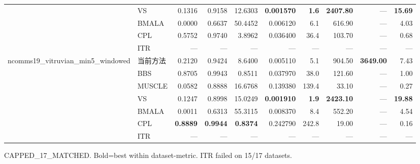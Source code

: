 \begin{table}[htbp]
\begin{tabular}{llrrrrrrrr}
 & VS & 0.1316 & 0.9158 & 12.6303 & \textbf{0.001570} & \textbf{1.6} & \textbf{2407.80} & — & \textbf{15.69} \\
 & BMALA & 0.0000 & 0.6637 & 50.4452 & 0.006120 & 6.1 & 616.90 & — & 4.03 \\
 & CPL & 0.5752 & 0.9740 & 3.8962 & 0.036400 & 36.4 & 103.70 & — & 0.68 \\
 & ITR & — & — & — & — & — & — & — & — \\
\midrule
\multirow{7}{*}{ncomms19\_vitruvian\_min5\_windowed} & 当前方法 & 0.2120 & 0.9424 & 8.6400 & 0.005110 & 5.1 & 904.50 & \textbf{3649.00} & 7.43 \\
 & BBS & 0.8705 & 0.9943 & 0.8511 & 0.037970 & 38.0 & 121.60 & — & 1.00 \\
 & MUSCLE & 0.0582 & 0.8888 & 16.6768 & 0.139380 & 139.4 & 33.10 & — & 0.27 \\
 & VS & 0.1247 & 0.8998 & 15.0249 & \textbf{0.001910} & \textbf{1.9} & \textbf{2423.10} & — & \textbf{19.88} \\
 & BMALA & 0.0011 & 0.6313 & 55.3115 & 0.008370 & 8.4 & 552.20 & — & 4.54 \\
 & CPL & \textbf{0.8889} & \textbf{0.9944} & \textbf{0.8374} & 0.242790 & 242.8 & 19.00 & — & 0.16 \\
 & ITR & — & — & — & — & — & — & — & — \\
\midrule
\bottomrule
\end{tabular}
\vspace{4pt}
\footnotesize{CAPPED_17_MATCHED. Bold=best within dataset-metric. ITR failed on 15/17 datasets.}
\end{table}


